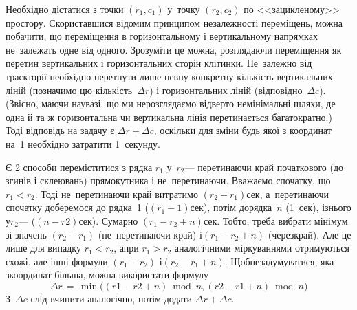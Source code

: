 {

\Tutorial	Необхідно дістатися з точки $(r_1, c_1)$ у~точку $(r_2, c_2)$ по <<зацикленому>> простору. 
Скориставшися відомим принципом незалежності переміщень, можна побачити, що переміщення в горизонтальному і вертикальному напрямках не~залежать одне від одного. Зрозуміти це можна, розглядаючи переміщення як перетин вертикальних і горизонтальних сторін клітинки. Не~залежно від траєкторії необхідно перетнути лише певну конкретну кількість вертикальних ліній (позначимо цю кількість~$\Delta{}r$) і горизонтальних ліній (відповідно~$\Delta{}c$). (Звісно, маючи на\nolinebreak[3] увазі, що ми не\nolinebreak[3] розглядаємо відверто не\nolinebreak[3] мінімальні шляхи, де одна й та ж горизонтальна чи вертикальна лінія перетинається багатократно.) Тоді відповідь на задачу є ${\Delta{}r+\Delta{}c}$, оскільки для зміни будь якої з координат на~1 необхідно затратити 1~секунду.

Є 2 способи переміститися з рядка $r_1$ у~$r_2$\nolinebreak[3] --- перетинаючи край початкового (до згинів і склеювань) прямокутника і не~перетинаючи. Вважаємо спочатку, що ${r_1{<}r_2}$. Тоді не~перетинаючи край витратимо ${(r_2{-}r_1)}$\nolinebreak[2] сек, а~перетинаючи спочатку доберемося до рядка~1 (${(r_1{-}1)}$\nolinebreak[2] сек),  потім до\nolinebreak[1] рядка~$n$ (1~сек), і\nolinebreak[2] з\nolinebreak[2] нього у\nolinebreak[3] $r_2$\nolinebreak[3] --- (${(n{-}r2)}$\nolinebreak[2] сек). Сумарно ${(r_1{-}r_2{+}n)}$\nolinebreak[2] сек. 
Тобто, треба вибрати мінімум зі значень ${(r_2{-}r_1)}$ (не~перетинаючи край) і\nolinebreak[3] ${(r_1{-}r_2{+}n)}$ (через\nolinebreak[3] край). Але це лише для випадку ${r_1{<}r_2}$, а\nolinebreak[3] при ${r_1{>}r_2}$ аналогічними міркуваннями отримуються схожі, але інші формули ${(r_1{-}r_2)}$ і\nolinebreak[3] ${(r_2{-}r_1{+}n)}$. Щоб\nolinebreak[2] не\nolinebreak[2] задумуватися, яка з\nolinebreak[3] координат більша, можна використати формулу
$$
\Delta{}r \, = \, \min\bigl((r1-r2+n) \bmod n, (r2-r1+n) \bmod n\bigr)
$$
З~$\Delta{}c$ слід вчинити аналогічно, потім додати ${\Delta{}r+\Delta{}c}$.

}